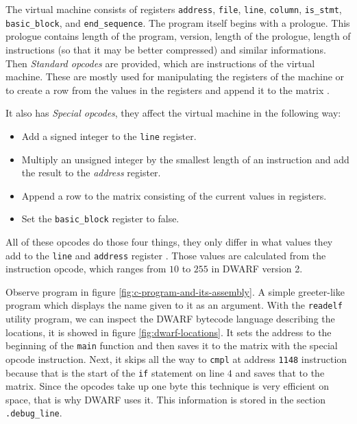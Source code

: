 The virtual machine consists of registers \texttt{address}, \texttt{file},
\texttt{line}, \texttt{column}, \texttt{is\_stmt}, \texttt{basic\_block}, and
\texttt{end\_sequence}. The program itself begins with a prologue. This
prologue contains length of the program, version, length of the prologue,
length of instructions (so that it may be better compressed) and similar
informations. Then \textit{Standard opcodes} are provided, which are
instructions of the virtual machine. These are mostly used for manipulating the
registers of the machine or to create a row from the values in the registers
and append it to the matrix \cite{dwarf}. 

It also has \textit{Special opcodes}, they affect the virtual machine in the
following way:
\begin{itemize}
    \item Add a signed integer to the \texttt{line} register.
    \item Multiply an unsigned integer by the smallest length of an instruction
        and add the result to the \textit{address} register.
    \item Append a row to the matrix consisting of the current values in
        registers.
    \item Set the \texttt{basic\_block} register to false.
\end{itemize}
All of these opcodes do those four things, they only differ in what values they
add to the \texttt{line} and \texttt{address} register \cite{dwarf}. Those
values are calculated from the instruction opcode, which ranges from $10$ to
$255$ in DWARF version 2. 

Observe program in figure \ref{fig:c-program-and-its-assembly}. A simple
greeter-like program which displays the name given to it as an argument. With
the \texttt{readelf} utility program, we can inspect the DWARF bytecode
language describing the locations, it is showed in figure
\ref{fig:dwarf-locations}. It sets the address to the beginning of the
\texttt{main} function and then saves it to the matrix with the special opcode
instruction. Next, it skips all the way to \texttt{cmpl} at address
\texttt{1148} instruction because that is the start of the \texttt{if}
statement on line $4$ and saves that to the matrix. Since the opcodes take up
one byte this technique is very efficient on space, that is why DWARF uses it.
This information is stored in the section \texttt{.debug\_line}.

